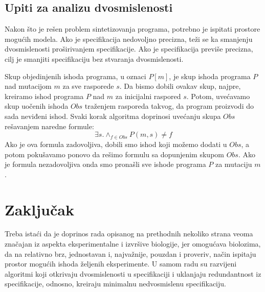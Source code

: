 \documentclass[a4paper]{article}
\begin{document}
\subsection{Upiti za analizu dvosmislenosti}
Nakon što je rešen problem sintetizovanja programa, potrebno je ispitati prostore mogućih modela. Ako je specifikacija nedovoljno precizna, teži se ka smanjenju dvosmislenosti proširivanjem specifikacije. Ako je specifikacija previše precizna, cilj je smanjiti specifikaciju bez stvaranja dvosmislenosti.

Skup objedinjenih ishoda programa, u oznaci $P[m]$, je skup ishoda programa $P$ nad mutacijom $m$ za sve rasporede $s$. Da bismo dobili ovakav skup, najpre, kreiramo ishod programa $P$ nad $m$ za inicijalni raspored $s$. Potom, uvećavamo skup uočenih ishoda $Obs$ traženjem rasporeda takvog, da program proizvodi do sada neviđeni ishod. Svaki korak algoritma doprinosi uvećanju skupa $Obs$ rešavanjem naredne formule:
\begin{equation}
\exists s. \wedge_{f \in Obs} P(m,s) \neq f
\end{equation}
Ako je ova formula zadovoljiva, dobili smo ishod koji možemo dodati u $Obs$, a potom pokušavamo ponovo da rešimo formulu sa dopunjenim skupom $Obs$. Ako je formula nezadovoljiva onda smo pronašli sve ishode programa $P$ za mutaciju $m$.

\section{Zaključak}
\label{sec:zakljucak}
Treba istaći da je doprinos rada opisanog na prethodnih nekoliko strana veoma značajan iz aspekta eksperimentalne i izvršive biologije, jer omogućava biolozima, da na relativno brz, jednostavan i, najvažnije, pouzdan i proveriv, način ispitaju prostor mogućih ishoda željenih eksperimente. U samom radu su razvijeni algoritmi koji otkrivaju dvosmislenosti u specifikaciji i uklanjaju redundantnost iz specifikacije, odnosno, kreiraju minimalnu nedvosmislenu specifikaciju.

\appendix
 

\end{document}
